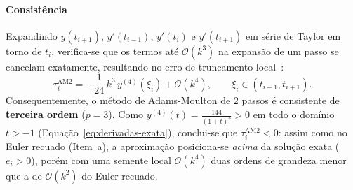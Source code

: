 \documentclass[12pt, a4paper]{article}
\begin{document}
\paragraph{Consistência} Expandindo $y(t_{i+1})$, $y'(t_{i-1})$, $y'(t_i)$ e $y'(t_{i+1})$ em série de Taylor em torno de
$t_i$, verifica-se que os termos até $\mathcal{O}(k^3)$
na expansão de um passo se cancelam exatamente, resultando no erro de truncamento local~\cite{leveque2007,suli2003}:
\begin{equation}\label{eq:lte-am2}
  \tau_i^{\text{AM2}} 
  = -\frac{1}{24}\,k^3\,y^{(4)}(\xi_i) + \mathcal{O}(k^4), \qquad \xi_i \in (t_{i-1}, t_{i+1}).
\end{equation}
Consequentemente, o método de Adams-Moulton de 2 passos é consistente de \textbf{terceira ordem} ($p = 3$). Como $y^{(4)}(t) = \frac{144}{(1+t)^5} > 0$ em todo o domínio $t > -1$ (Equação~\eqref{eq:derivadas-exata}), conclui-se que $\tau_i^{\text{AM2}} < 0$: assim como no Euler recuado (Item~a), a aproximação posiciona-se \emph{acima} da solução exata ($e_i > 0$), porém com uma semente local $\mathcal{O}(k^4)$ duas ordens de grandeza menor que a de $\mathcal{O}(k^2)$ do Euler recuado.
\end{document}
